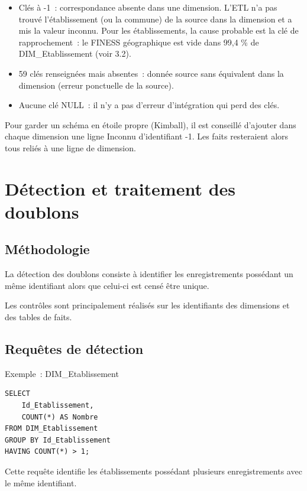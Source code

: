 \begin{itemize}
	\item Clés à -1~: correspondance absente dans une dimension. L'ETL n'a pas trouvé l'établissement (ou la commune) de la source dans la dimension et a mis la valeur \og inconnu\fg{}. Pour les établissements, la cause probable est la clé de rapprochement~: le FINESS géographique est vide dans 99,4 \% de DIM\_Etablissement (voir 3.2).
	\item 59 clés renseignées mais absentes~: donnée source sans équivalent dans la dimension (erreur ponctuelle de la source).
	\item Aucune clé NULL~: il n'y a pas d'erreur d'intégration qui perd des clés.
\end{itemize}

\noindent Pour garder un schéma en étoile propre (Kimball), il est conseillé d'ajouter dans chaque dimension une ligne \og Inconnu\fg{} d'identifiant -1. Les faits resteraient alors tous reliés à une ligne de dimension.


\section{Détection et traitement des doublons}

\subsection{Méthodologie}

\noindent La détection des doublons consiste à identifier les enregistrements possédant un même identifiant alors que celui-ci est censé être unique.

\noindent Les contrôles sont principalement réalisés sur les identifiants des dimensions et des tables de faits.

\subsection{Requêtes de détection}

\noindent Exemple~: DIM\_Etablissement

\begin{verbatim}
SELECT
    Id_Etablissement,
    COUNT(*) AS Nombre
FROM DIM_Etablissement
GROUP BY Id_Etablissement
HAVING COUNT(*) > 1;
\end{verbatim}

\noindent Cette requête identifie les établissements possédant plusieurs enregistrements avec le même identifiant.

